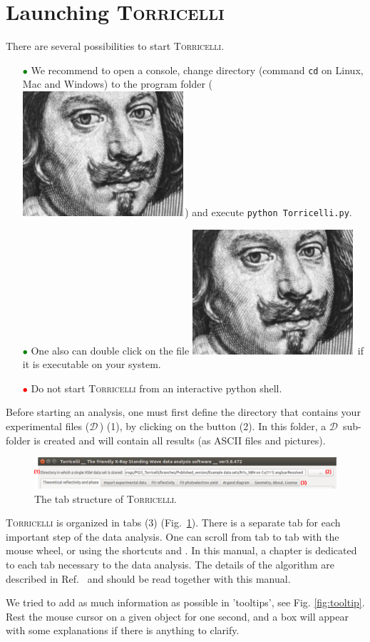 \documentclass[oldfontcommands,openany,oneside]{memoir}
\newcommand{\dirTorri}[1]{{\fontsize{9}{0}\selectfont\faFolderOpenO\includegraphics{img/Torricelli_icon.png}}$\,${\fontsize{7}{0}\selectfont\faCaretRight}\directory{#1}}
\newcommand{\dirData}[1]{{\fontsize{9}{0}\selectfont\faFolderOpenO$\mathcal{D}$}$\,${\fontsize{7}{0}\selectfont\faCaretRight}\directory{#1}}
\newcommand{\fileTorri}[1]{{\fontsize{9}{0}\selectfont\faFileO\hspace{1px}\includegraphics{img/Torricelli_icon.png}}$\,${\fontsize{7}{0}\selectfont\faCaretRight}\directory{#1}}
\begin{document}
\section{Launching \textsc{Torricelli}} %

There are several possibilities to  start \textsc{Torricelli}.
\begin{itemize}
\item[\textcolor{green}{$\bullet$}] We recommend to open a console, change directory (command \texttt{cd} on Linux, Mac and Windows) to the program folder (\dirTorri{}) and execute \verb+python Torricelli.py+.
\item[\textcolor{green}{$\bullet$}] One also can double click on the file \fileTorri{\textsc{Torricelli}.py} if it is executable on your system. 
\item[\textcolor{red}{$\bullet$}] Do not start \textsc{Torricelli} from an interactive python shell.
\end{itemize}
Before starting an analysis, one must first define the directory that contains your experimental files (\dirData{}) (1), by clicking on the  button (2). In this folder, a \dirData{results/} sub-folder is created and will contain all results (as ASCII files and pictures).

\begin{figure}[!h]
  \centering
  \includegraphics[width=1\textwidth]{img/Screenshot_Tab.pdf}
  \caption{The tab structure of \textsc{Torricelli}.}
  \label{fig:Tab}
\end{figure}

  \textsc{Torricelli} is organized in tabs (3) (Fig.~\ref{fig:Tab}). There is a separate tab for each important step of the data analysis. One can scroll from tab to tab with the mouse wheel, or using the shortcuts  and . In this manual, a chapter is dedicated to each tab necessary to the data analysis. The details of the algorithm are described in Ref.~\cite{Bocquet2018} and should be read together with this manual.

We tried to add as much information as possible in 'tooltips', see Fig. \ref{fig:tooltip}. Rest the mouse cursor on a given object for one second, and a box will appear with some explanations if there is anything to clarify.
\end{document}
